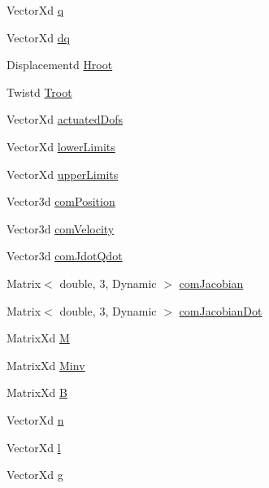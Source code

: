 \begin{DoxyCompactItemize}
\item 
Vector\+Xd \hyperlink{structModel3T_1_1Pimpl_aafa871718688ff6322cbfffed9ada401}{q}
\item 
Vector\+Xd \hyperlink{structModel3T_1_1Pimpl_a38a7e4a5908517ee2bd63c75eb570f63}{dq}
\item 
Displacementd \hyperlink{structModel3T_1_1Pimpl_a02c47a2c2920e1ddfce6457502061f0b}{Hroot}
\item 
Twistd \hyperlink{structModel3T_1_1Pimpl_a5b282557f05769af0f2e60709d348a43}{Troot}
\item 
Vector\+Xd \hyperlink{structModel3T_1_1Pimpl_a7bf8960ca39185d73d9dcc28451ae7a3}{actuated\+Dofs}
\item 
Vector\+Xd \hyperlink{structModel3T_1_1Pimpl_a635ed979bb210444627f06eb65db8f29}{lower\+Limits}
\item 
Vector\+Xd \hyperlink{structModel3T_1_1Pimpl_a3b3b41e690971ea00156bdfefb813a5c}{upper\+Limits}
\item 
Vector3d \hyperlink{structModel3T_1_1Pimpl_a61412bd640cbf9f3bffa791261123328}{com\+Position}
\item 
Vector3d \hyperlink{structModel3T_1_1Pimpl_a80c7336da4224ba5105c067870e818bb}{com\+Velocity}
\item 
Vector3d \hyperlink{structModel3T_1_1Pimpl_a997711d057aa854ab997992497fe276b}{com\+Jdot\+Qdot}
\item 
Matrix$<$ double, 3, Dynamic $>$ \hyperlink{structModel3T_1_1Pimpl_ab93624d4ec1d08338eb24528b8a3ca68}{com\+Jacobian}
\item 
Matrix$<$ double, 3, Dynamic $>$ \hyperlink{structModel3T_1_1Pimpl_ad1f6cba54dc65db31d3a4e54ba00acdf}{com\+Jacobian\+Dot}
\item 
Matrix\+Xd \hyperlink{structModel3T_1_1Pimpl_a2756947646bc2a7485760f1599011764}{M}
\item 
Matrix\+Xd \hyperlink{structModel3T_1_1Pimpl_a6e50170f8b2b58e1e7a91244ffe1691c}{Minv}
\item 
Matrix\+Xd \hyperlink{structModel3T_1_1Pimpl_a79e662bd2907360085b1adda5a2217b6}{B}
\item 
Vector\+Xd \hyperlink{structModel3T_1_1Pimpl_a964360277690839fc358bb663a2cd949}{n}
\item 
Vector\+Xd \hyperlink{structModel3T_1_1Pimpl_a7fcae8ba57e320a9066aa9b640f414cb}{l}
\item 
Vector\+Xd \hyperlink{structModel3T_1_1Pimpl_a8a6bd5458703a775e213e47794a59d7d}{g}
\item 

\end{DoxyCompactItemize}
